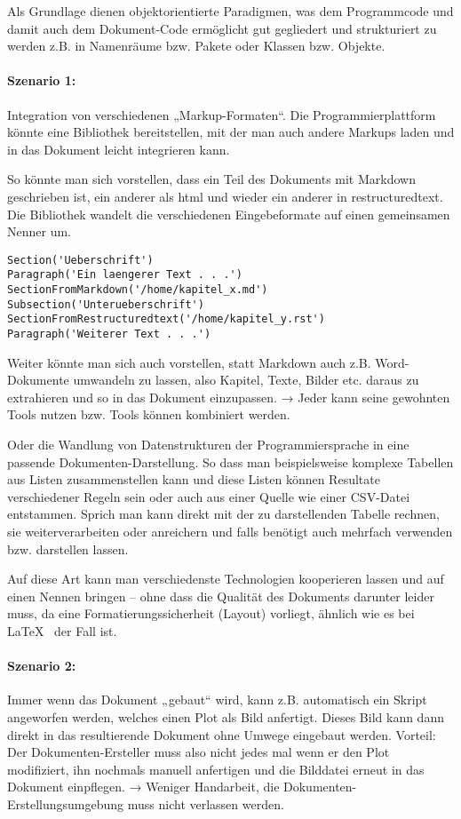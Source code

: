 Als Grundlage dienen objektorientierte Paradigmen, was dem Programmcode
und damit auch dem Dokument-Code ermöglicht gut gegliedert und strukturiert
zu werden z.B. in Namenräume bzw. Pakete oder Klassen bzw. Objekte.

\paragraph{Szenario 1:} Integration von verschiedenen „Markup-Formaten“.
Die Programmierplattform könnte eine Bibliothek bereitstellen, mit der
man auch andere Markups laden und in das Dokument leicht integrieren
kann.

So könnte man sich vorstellen, dass ein Teil des Dokuments mit Markdown
geschrieben ist, ein anderer als html und wieder ein anderer in
restructuredtext. Die Bibliothek wandelt die verschiedenen Eingebeformate
auf einen gemeinsamen Nenner um.

\begin{verbatim}
Section('Ueberschrift')
Paragraph('Ein laengerer Text . . .')
SectionFromMarkdown('/home/kapitel_x.md')
Subsection('Unterueberschrift')
SectionFromRestructuredtext('/home/kapitel_y.rst')
Paragraph('Weiterer Text . . .')
\end{verbatim}

Weiter könnte man sich auch vorstellen, statt Markdown auch z.B. Word-Dokumente
umwandeln zu lassen, also Kapitel, Texte, Bilder etc. daraus zu extrahieren und so in
das Dokument einzupassen. → Jeder kann seine gewohnten Tools nutzen bzw.
Tools können kombiniert werden.

Oder die Wandlung von Datenstrukturen der Programmiersprache in eine passende
Dokumenten-Darstellung. So dass man beispielsweise komplexe Tabellen aus
Listen zusammenstellen kann und diese Listen können Resultate
verschiedener Regeln sein oder auch aus einer Quelle wie einer CSV-Datei
entstammen. Sprich man kann direkt mit der zu darstellenden Tabelle
rechnen, sie weiterverarbeiten oder anreichern und falls benötigt auch
mehrfach verwenden bzw. darstellen lassen.

Auf diese Art kann man verschiedenste Technologien kooperieren lassen und
auf einen Nennen bringen -- ohne dass die Qualität des Dokuments darunter
leider muss, da eine Formatierungssicherheit (Layout) vorliegt,
ähnlich wie es bei \LaTeX~ der Fall ist.

\paragraph{Szenario 2:} Immer wenn das Dokument „gebaut“ wird, kann z.B.
automatisch ein Skript angeworfen werden, welches einen Plot als Bild
anfertigt. Dieses Bild kann dann direkt in das resultierende Dokument ohne
Umwege eingebaut werden. Vorteil: Der Dokumenten-Ersteller muss also nicht jedes
mal wenn er den Plot modifiziert, ihn nochmals manuell anfertigen und
die Bilddatei erneut in das Dokument einpflegen. → Weniger Handarbeit,
die Dokumenten-Erstellungsumgebung muss nicht verlassen werden.

